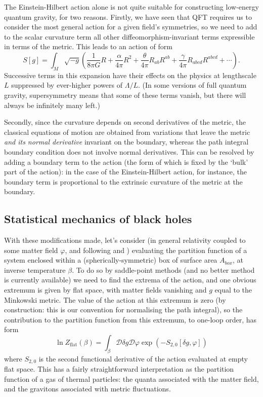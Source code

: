 \documentclass[12pt]{article}
\newcommand{\mc}[1]{\ensuremath{\mathcal{#1}}}
\newcommand{\be}{\begin{equation}}
\newcommand{\ee}{\end{equation}}
\begin{document}
The Einstein-Hilbert action alone is not quite suitable for constructing low-energy quantum gravity, for two reasons. Firstly, we have seen that QFT requires us to consider the most general action for a given field's symmetries, so we need to add to the scalar curvature term all other diffeomorphism-invariant terms expressible in terms of the metric. This leads to an action of form
\be \label{generalisedaction}
S[g] = \int_M \sqrt{-g} \left( \frac{1}{8\pi G}  R  + \frac{\alpha}{4\pi} R^2 + \frac{\theta}{4\pi}R_{ab}R^{ab} + \frac{\gamma}{4\pi}R_{abcd}R^{abcd}+\cdots \right).
\ee
Successive terms in this expansion have their effects on the physics at lengthscale $L$ suppressed by ever-higher powers of $\Lambda/L$. (In some versions of full quantum gravity, supersymmetry means that some of these terms vanish, but there will always be infinitely many left.)

Secondly, since the curvature depends on second derivatives of the metric, the classical equations of motion are obtained from variations that leave the metric \emph{and its normal derivative} invariant on the boundary, whereas the path integral boundary condition does not involve normal derivatives. This can be resolved by adding a boundary term to the action (the form of which is fixed by the `bulk' part of the action): in the case of the Einstein-Hilbert action, for instance, the boundary term is proportional to the extrinsic curvature of the metric at the boundary.

\subsection{Statistical mechanics of black holes}

With these modifications made, let's consider (in general relativity coupled to some matter field $\varphi$, and following  and ) evaluating the partition function  of a system enclosed within a (spherically-symmetric) box of surface area $A_{box}$, at inverse temperature $\beta$. To do so by saddle-point methods (and no better method is currently available) we need to find the extrema of the action, and one obvious extremum is given by flat space, with matter fields vanishing and $g$ equal to the Minkowski metric. The value of the action at this extremum is zero (by construction: this is our convention for normalising the path integral), so the contribution to the partition function from this extremum, to one-loop order, has form
\be
\ln Z_{\mbox{flat}}(\beta) =  \int_\beta \mc{D}\delta g \mc{D}\varphi \exp(- S_{2,0}[\delta g,\varphi])
\ee
where $S_{2,0}$ is the second functional derivative of the action evaluated at empty flat space.
This has a fairly straightforward interpretation as the partition function of a gas of thermal particles: the quanta associated with the matter field, and the gravitons associated with metric fluctuations. 
\end{document}
